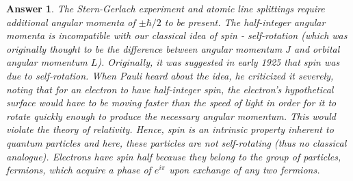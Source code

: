 \documentclass[a4paper]{article}
\newtheorem{ans}{Answer}[subsection]
\theoremstyle{new}
\begin{document}
\begin{ans}
The Stern-Gerlach experiment and atomic line splittings require additional angular momenta of $\pm\hbar/2$ to be present. The half-integer angular momenta is incompatible with our classical idea of spin - self-rotation (which was originally thought to be the difference between angular momentum $J$ and orbital angular momentum $L$). Originally, it was suggested in early 1925 that spin was due to self-rotation. When Pauli heard about the idea, he criticized it severely, noting that for an electron to have half-integer spin, the electron's hypothetical surface would have to be moving faster than the speed of light in order for it to rotate quickly enough to produce the necessary angular momentum. This would violate the theory of relativity. Hence, spin is an intrinsic property inherent to quantum particles and here, these particles are not self-rotating (thus no classical analogue). Electrons have spin half because they belong to the group of particles, fermions, which acquire a phase of $e^{i\pi}$ upon exchange of any two fermions. 
\end{ans}
\newpage
\end{document}

